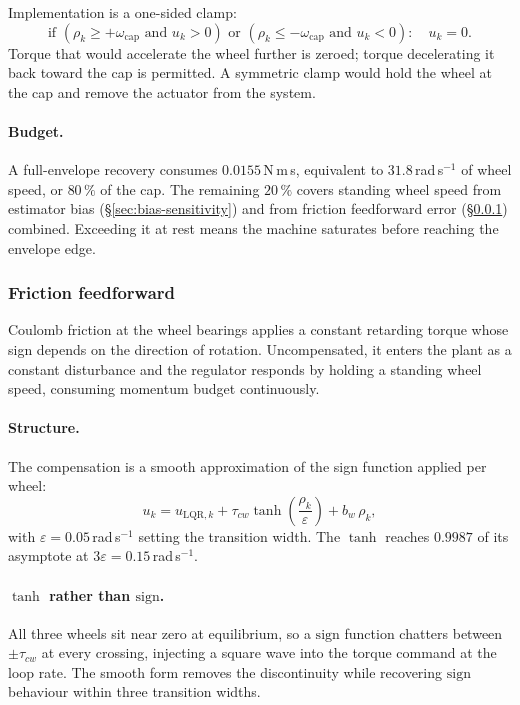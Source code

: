 Implementation is a one-sided clamp:
%
\begin{equation}
  \text{if } (\rho_k \ge +\omega_{\mathrm{cap}} \text{ and } u_k > 0)
  \text{ or }
  (\rho_k \le -\omega_{\mathrm{cap}} \text{ and } u_k < 0):
  \quad u_k = 0.
  \label{eq:wheel-cap}
\end{equation}
%
Torque that would accelerate the wheel further is zeroed; torque decelerating
it back toward the cap is permitted. A symmetric clamp would hold the wheel
at the cap and remove the actuator from the system.

\paragraph{Budget.} A full-envelope recovery consumes
$0.0155$\,N\,m\,s, equivalent to $31.8$\,rad\,s$^{-1}$ of wheel speed, or
$80\,\%$ of the cap. The remaining $20\,\%$ covers standing wheel speed from
estimator bias (\S\ref{sec:bias-sensitivity}) and from friction feedforward
error (\S\ref{sec:friction}) combined. Exceeding it at rest means the machine
saturates before reaching the envelope edge.

\subsubsection{Friction feedforward}
\label{sec:friction}

Coulomb friction at the wheel bearings applies a constant retarding torque
whose sign depends on the direction of rotation. Uncompensated, it enters the
plant as a constant disturbance and the regulator responds by holding a
standing wheel speed, consuming momentum budget continuously.

\paragraph{Structure.} The compensation is a smooth approximation of the sign
function applied per wheel:
%
\begin{equation}
  u_k = u_{\mathrm{LQR},k}
        + \tau_{cw}\tanh\!\left(\frac{\rho_k}{\varepsilon}\right)
        + b_w\,\rho_k ,
  \label{eq:feedforward}
\end{equation}
%
with $\varepsilon = 0.05$\,rad\,s$^{-1}$ setting the transition width. The
$\tanh$ reaches $0.9987$ of its asymptote at $3\varepsilon =
0.15$\,rad\,s$^{-1}$.

\paragraph{$\tanh$ rather than $\mathrm{sign}$.} All three wheels sit near
zero at equilibrium, so a $\mathrm{sign}$ function chatters between
$\pm\tau_{cw}$ at every crossing, injecting a square wave into the torque
command at the loop rate. The smooth form removes the discontinuity while
recovering $\mathrm{sign}$ behaviour within three transition widths.

